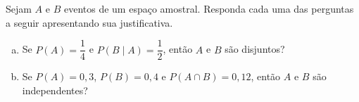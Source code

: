 %
%


\begin{exercicioBanco}[\valorquestao]
Sejam \(A\) e \(B\) eventos de um espaço amostral. Responda cada uma das perguntas a seguir apresentando sua justificativa.

\begin{enumerate}[(a)]
    \item Se \(P(A) = \dfrac{1}{4}\) e \(P(B \mid A) = \dfrac{1}{2}\), então \(A\) e \(B\) são disjuntos?
    \item Se \(P(A) = 0,3\), \(P(B) = 0,4\) e \(P(A\cap B) = 0,12\), então \(A\) e \(B\) são independentes?
\end{enumerate}

\end{exercicioBanco}


